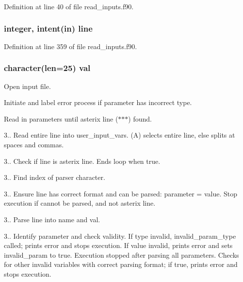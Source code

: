 Definition at line 40 of file read\-\_\-inputs.\-f90.

\hypertarget{read__inputs_8f90_a1e765e78c796c355d042ac4da36118f1}{
\subsubsection[{line}]{\setlength{\rightskip}{0pt plus 5cm}integer, intent(in) line}}\label{read__inputs_8f90_a1e765e78c796c355d042ac4da36118f1}


Definition at line 359 of file read\-\_\-inputs.\-f90.

\hypertarget{read__inputs_8f90_adc3f146dd63dc3a68f4024d9527d2583}{
\subsubsection[{val}]{\setlength{\rightskip}{0pt plus 5cm}character(len=25) val}}\label{read__inputs_8f90_adc3f146dd63dc3a68f4024d9527d2583}

\begin{DoxyEnumerate}
\item Open input file.
\item Initiate and label error process if parameter has incorrect type.
\item Read in parameters until asterix line ($\ast$$\ast$$\ast$) found.
\end{DoxyEnumerate}

3.. Read entire line into user\-\_\-input\-\_\-vars. (A) selects entire line, else splits at spaces and commas.

3.. Check if line is asterix line. Ends loop when true.

3.. Find index of parser character.

3.. Ensure line has correct format and can be parsed\-: parameter = value. Stop execution if cannot be parsed, and not asterix line.

3.. Parse line into name and val.

3.. Identify parameter and check validity. If type invalid, invalid\-\_\-param\-\_\-type called; prints error and stops execution. If value invalid, prints error and sets invalid\-\_\-param to true. Execution stopped after parsing all parameters. Checks for other invalid variables with correct parsing format; if true, prints error and stops execution.


